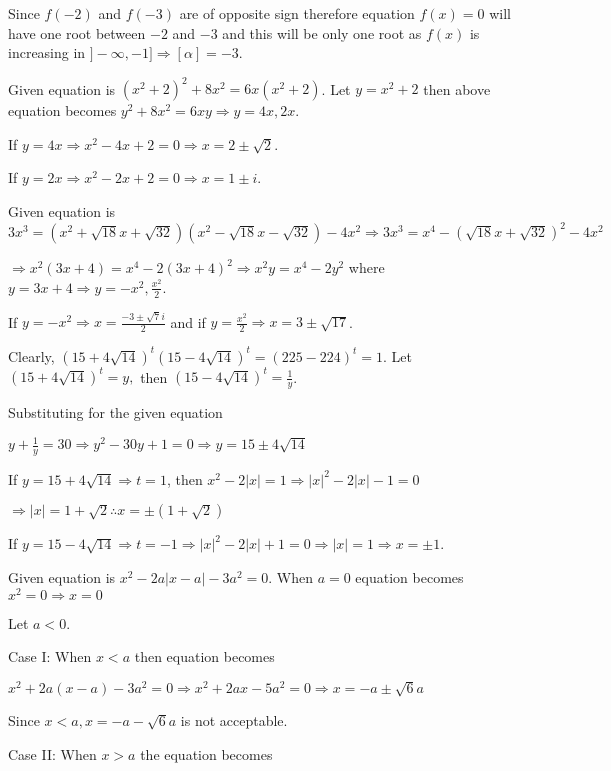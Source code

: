   Since $f(-2)$ and $f(-3)$ are of opposite sign therefore equation $f(x) = 0$ will have one root
  between $-2$ and $-3$ and this will be only one root as $f(x)$ is increasing in $]-\infty,
  -1]\Rightarrow [\alpha] = -3$.
\item Given equation is $(x^2 + 2)^2 + 8x^2 = 6x(x^2 + 2)$. Let $y = x^2 + 2$ then above equation becomes
  $y^2 + 8x^2 = 6xy\Rightarrow y = 4x, 2x$.

  If $y = 4x \Rightarrow x^2 - 4x + 2 = 0 \Rightarrow x = 2 \pm \sqrt{2}$.

  If $y = 2x \Rightarrow x^2 - 2x + 2 = 0 \Rightarrow x = 1 \pm i$.
\item Given equation is $3x^3 = (x^2 + \sqrt{18}x + \sqrt{32})(x^2 - \sqrt{18}x - \sqrt{32}) -
  4x^2\Rightarrow 3x^3 = x^4 - (\sqrt{18}x + \sqrt{32})^2 - 4x^2$

  $\Rightarrow x^2(3x + 4) = x^4 - 2(3x + 4)^2\Rightarrow x^2y = x^4 - 2y^2$ where $y = 3x + 4\Rightarrow y
  = -x^2, \frac{x^2}{2}$.

  If $y = -x^2 \Rightarrow x = \frac{-3 \pm \sqrt{7}i}{2}$ and if $y = \frac{x^2}{2} \Rightarrow x = 3 \pm
  \sqrt{17}$.
\item Clearly, $(15 + 4\sqrt{14})^t(15 - 4\sqrt{14})^t = (225 - 224)^t = 1$. Let $(15 + 4\sqrt{14})^t = y,$
  then $(15 - 4\sqrt{14})^t = \frac{1}{y}$.

  Substituting for the given equation

  $y + \frac{1}{y} = 30 \Rightarrow y^2 - 30y + 1 = 0\Rightarrow y = 15 \pm 4\sqrt{14}$

  If $y = 15 + 4\sqrt{14} \Rightarrow t = 1$, then $x^2 - 2|x| = 1 \Rightarrow |x|^2 - 2|x| - 1 = 0$

  $\Rightarrow |x| = 1 + \sqrt{2} \therefore x = \pm(1 + \sqrt{2})$

  If $y = 15 - 4\sqrt{14} \Rightarrow t = -1\Rightarrow |x|^2 - 2|x| + 1 = 0 \Rightarrow |x| = 1 \Rightarrow
  x = \pm1$.
\item Given equation is $x^2 - 2a|x - a| - 3a^2 = 0$. When $a = 0$ equation becomes $x^2 = 0 \Rightarrow x = 0$

  Let $a < 0$.

  Case I: When $x < a$ then equation becomes

  $x^2 + 2a(x - a) - 3a^2 = 0 \Rightarrow x^2 + 2ax - 5a^2 = 0 \Rightarrow x = -a \pm \sqrt{6}a$

  Since $x < a, x = -a - \sqrt{6}a$  is not acceptable.

  Case II: When $x > a$ the equation becomes

